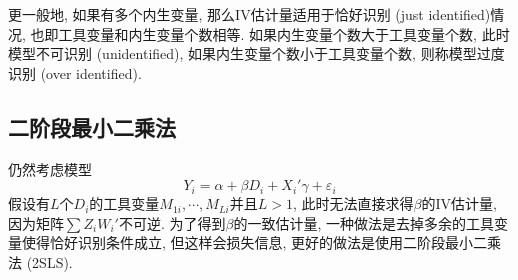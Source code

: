 \documentclass[cn,blue,14pt,screen,bibstyle=gb7714-2015]{elegantnote}
\begin{document}
更一般地, 如果有多个内生变量, 那么IV估计量适用于恰好识别 (just identified)情况, 也即工具变量和内生变量个数相等. 如果内生变量个数大于工具变量个数, 此时模型不可识别 (unidentified), 如果内生变量个数小于工具变量个数, 则称模型过度识别 (over identified).
\subsection{二阶段最小二乘法}
仍然考虑模型
$$Y_i=\alpha+\beta D_i+X_i'\gamma+\varepsilon_i$$
假设有$L$个$D_i$的工具变量$M_{1i},\cdots,M_{Li}$并且$L>1$, 此时无法直接求得$\beta$的IV估计量, 因为矩阵$\sum Z_iW_i'$不可逆. 为了得到$\beta$的一致估计量, 一种做法是去掉多余的工具变量使得恰好识别条件成立, 但这样会损失信息, 更好的做法是使用二阶段最小二乘法 (2SLS).
\end{document}
